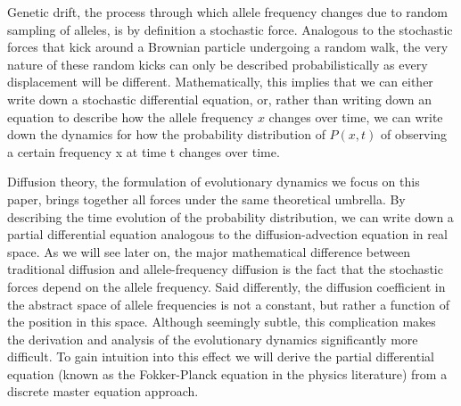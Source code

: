 Genetic drift, the process through which allele frequency changes due to random
sampling of alleles, is by definition a stochastic force. Analogous to the
stochastic forces that kick around a Brownian particle undergoing a random walk,
the very nature of these random kicks can only be described probabilistically as
every displacement will be different. Mathematically, this implies that we can
either write down a stochastic differential equation, or, rather than writing
down an equation to describe how the allele frequency $x$ changes over time, we
can write down the dynamics for how the probability distribution of $P(x, t)$ of
observing a certain frequency x at time t changes over time.

Diffusion theory, the formulation of evolutionary dynamics we focus on this
paper, brings together all forces under the same theoretical umbrella. By
describing the time evolution of the probability distribution, we can write down
a partial differential equation analogous to the diffusion-advection equation in
real space. As we will see later on, the major mathematical difference between
traditional diffusion and allele-frequency diffusion is the fact that the
stochastic forces depend on the allele frequency. Said differently, the
diffusion coefficient in the abstract space of allele frequencies is not a
constant, but rather a function of the position in this space. Although
seemingly subtle, this complication makes the derivation and analysis of the
evolutionary dynamics significantly more difficult. To gain intuition into this
effect we will derive the partial differential equation (known as the
Fokker-Planck equation in the physics literature) from a discrete master
equation approach.
